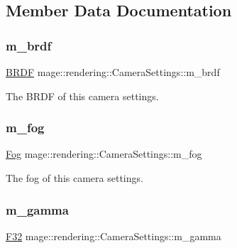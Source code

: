 \subsection{Member Data Documentation}
\hypertarget{classmage_1_1rendering_1_1_camera_settings_a18daf9b9c8c7319e7db996a406aa0a43}{}\label{classmage_1_1rendering_1_1_camera_settings_a18daf9b9c8c7319e7db996a406aa0a43} 
\subsubsection{\texorpdfstring{m\+\_\+brdf}{m\_brdf}}
{\footnotesize\ttfamily \hyperlink{namespacemage_1_1rendering_ab8fe8684ca4bd74ba3a394b00cf125b5}{B\+R\+DF} mage\+::rendering\+::\+Camera\+Settings\+::m\+\_\+brdf\hspace{0.3cm}{\ttfamily [private]}}

The B\+R\+DF of this camera settings. \hypertarget{classmage_1_1rendering_1_1_camera_settings_a173329d1022c717efe29e33eaa554d18}{}\label{classmage_1_1rendering_1_1_camera_settings_a173329d1022c717efe29e33eaa554d18} 
\subsubsection{\texorpdfstring{m\+\_\+fog}{m\_fog}}
{\footnotesize\ttfamily \hyperlink{classmage_1_1rendering_1_1_fog}{Fog} mage\+::rendering\+::\+Camera\+Settings\+::m\+\_\+fog\hspace{0.3cm}{\ttfamily [private]}}

The fog of this camera settings. \hypertarget{classmage_1_1rendering_1_1_camera_settings_aec2e610b98b3657f49944a59c4717bee}{}\label{classmage_1_1rendering_1_1_camera_settings_aec2e610b98b3657f49944a59c4717bee} 
\subsubsection{\texorpdfstring{m\+\_\+gamma}{m\_gamma}}
{\footnotesize\ttfamily \hyperlink{namespacemage_aa97e833b45f06d60a0a9c4fc22ae02c0}{F32} mage\+::rendering\+::\+Camera\+Settings\+::m\+\_\+gamma\hspace{0.3cm}{\ttfamily [private]}}

